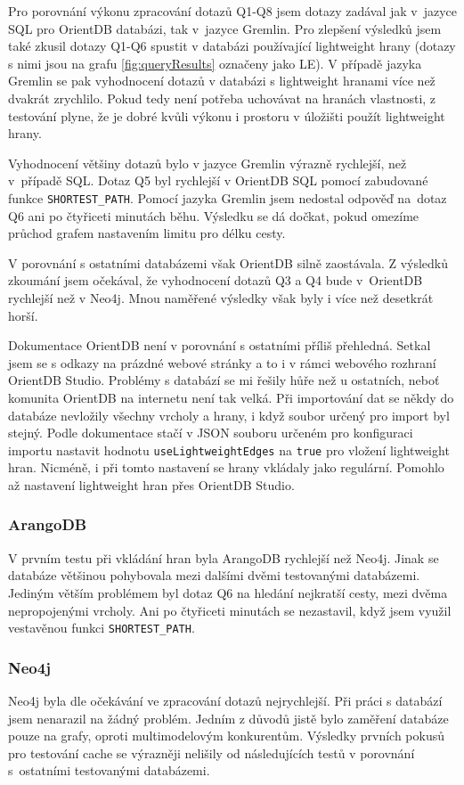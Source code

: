 \documentclass[
  program=infoi,
  biblatex=true,
  figures=true,
  glossaries=false,
  index,
  sourcecodes=true
]{kidiplom}
\begin{document}
Pro porovnání výkonu zpracování dotazů Q1-Q8 jsem dotazy zadával jak v~jazyce SQL pro OrientDB databázi, tak v~jazyce Gremlin. Pro zlepšení výsledků jsem také zkusil dotazy Q1-Q6 spustit v databázi používající lightweight hrany (dotazy s nimi jsou na grafu \ref{fig:queryResults} označeny jako LE). V případě jazyka Gremlin se pak vyhodnocení dotazů v databázi s lightweight hranami více než dvakrát zrychlilo. Pokud tedy není potřeba uchovávat na hranách vlastnosti, z testování plyne, že je dobré kvůli výkonu i prostoru v úložišti použít lightweight hrany.

Vyhodnocení většiny dotazů bylo v jazyce Gremlin výrazně rychlejší, než v~případě SQL. Dotaz Q5 byl rychlejší v OrientDB SQL pomocí zabudované funkce \texttt{SHORTEST\_PATH}. Pomocí jazyka Gremlin jsem nedostal odpověď na~dotaz Q6 ani po čtyřiceti minutách běhu. Výsledku se dá dočkat, pokud omezíme průchod grafem nastavením limitu pro délku cesty.

V porovnání s ostatními databázemi však OrientDB silně zaostávala. Z výsledků zkoumání \cite{benchmark} jsem očekával, že vyhodnocení dotazů Q3 a Q4 bude v~OrientDB rychlejší než v Neo4j. Mnou naměřené výsledky však byly i více než desetkrát horší.

Dokumentace OrientDB není v porovnání s ostatními příliš přehledná. Setkal jsem se s odkazy na prázdné webové stránky a to i v rámci webového rozhraní OrientDB Studio. Problémy s databází se mi řešily hůře než u ostatních, neboť komunita OrientDB na internetu není tak velká. Při importování dat se někdy do databáze nevložily všechny vrcholy a hrany, i když soubor určený pro import byl stejný. Podle dokumentace stačí v JSON souboru určeném pro konfiguraci importu nastavit hodnotu \texttt{useLightweightEdges} na \texttt{true} pro vložení lightweight hran. Nicméně, i při tomto nastavení se hrany vkládaly jako regulární. Pomohlo až nastavení lightweight hran přes OrientDB Studio.

\subsubsection{ArangoDB}
V prvním testu při vkládání hran byla ArangoDB rychlejší než Neo4j. Jinak se databáze většinou pohybovala mezi dalšími dvěmi testovanými databázemi.  Jediným větším problémem byl dotaz Q6 na hledání nejkratší cesty, mezi dvěma nepropojenými vrcholy. Ani po čtyřiceti minutách se nezastavil, když jsem využil vestavěnou funkci \texttt{SHORTEST\_PATH}.

\subsubsection{Neo4j}
Neo4j byla dle očekávání ve zpracování dotazů nejrychlejší. Při práci s databází jsem nenarazil na žádný problém. Jedním z důvodů jistě bylo zaměření databáze pouze na grafy, oproti multimodelovým konkurentům. Výsledky prvních pokusů pro testování cache se výrazněji nelišily od následujících testů v porovnání s~ostatními testovanými databázemi.
\end{document}
